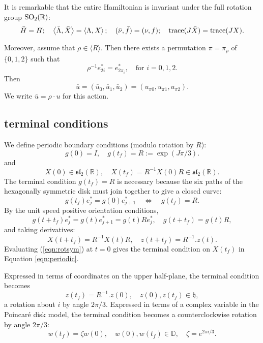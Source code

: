 \documentclass{article}
\theoremstyle{remark}
\newcommand{\ring}[1]{\mathbb{#1}}
\newcommand{\op}[1]{\hbox{#1}}
\newcommand{\ang}[1]{\left\langle{#1}\right\rangle}
\def\sl{\mathfrak{sl}_2(\ring{R})}
\def\SO{\op{SO}_2(\ring{R})}
\def\h{\mathfrak h}
\def\D{\ring{D}}
\newcommand\ee[1]{e_{#1}^*}
\begin{document}
It is remarkable that the entire Hamiltonian is invariant under the
full rotation group $\SO$:
\[
\bar H = H;\quad 
\ang{\bar\Lambda,\bar X} = \ang{\Lambda,X};\quad
(\bar \nu,\bar f)=(\nu,f);\quad
\op{trace}(J\bar X) = \op{trace}(J X).
\]

Moreover, assume that $\rho\in\langle R\rangle$. Then there exists a
permutation $\pi=\pi_\rho$ of $\{0,1,2\}$ such that
\[
\rho^{-1} \ee{2i} = \ee{2\pi_i}, \quad \text{for } i=0,1,2.
\]
Then
\begin{equation}\label{eqn:ubar}
\bar u =  (\bar u_0,\bar u_1,\bar u_2) = (u_{\pi 0},u_{\pi 1},u_{\pi 2}).
\end{equation}
We write $\bar u = \rho\cdot u$ for this action.


\subsection{terminal conditions}\label{sec:trans}


We define periodic boundary conditions (modulo rotation by $R$):
\[
g(0) = I,\quad g(t_f) = R := \exp(J\pi/3).
\]
and
\begin{equation}\label{eqn:periodic}
X(0) \in \sl,\quad X(t_f) = R^{-1} X(0) R \in \sl.
\end{equation}
The terminal condition $g(t_f)= R$ is necessary because the six paths
of the hexagonally symmetric disk must join together to give a closed
curve:
\begin{equation}\label{eqn:g-term}
g(t_f) \ee{j} = g(0) \ee{j+1}\quad \Leftrightarrow \quad g(t_f) = R.
\end{equation}
By the unit speed positive orientation conditions, 
\[
g(t+t_f) \ee{j} =
g(t) \ee{j+1} = g(t) R \ee{j},\quad
g(t + t_f) =g(t) R,
\] 
and taking derivatives: 
\begin{equation}\label{eqn:rotsym}
X(t+t_f) = R^{-1} X(t) R,\quad 
z(t+t_f) = R^{-1}.z(t).
\end{equation}
Evaluating (\ref{eqn:rotsym}) at
$t=0$ gives the terminal condition on $X(t_f)$ in Equation
\ref{eqn:periodic}.

Expressed in terms of coordinates on the upper half-plane, the
terminal condition becomes
\begin{equation}\label{eqn:z-term}
z(t_f) = R^{-1}. z(0),\quad z(0),z(t_f)\in \h,
\end{equation}
a rotation about $i$ by angle $2\pi/3$.
Expressed in terms of a complex variable in the Poincar\'e disk model,
the terminal condition becomes a counterclockwise rotation by angle
$2\pi/3$:
\[
w(t_f) = \zeta  w(0),\quad w(0),w(t_f) \in \D,\quad \zeta = e^{2\pi i/3}.
\]
\end{document}
